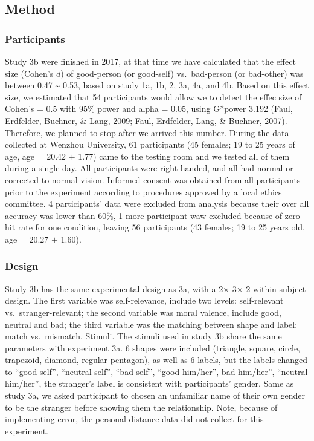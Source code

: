 \documentclass[
  english,
  man]{apa6}
\begin{document}
\hypertarget{method-4}{%
\subsection{Method}\label{method-4}}

\hypertarget{participants-5}{%
\subsubsection{Participants}\label{participants-5}}

Study 3b were finished in 2017, at that time we have calculated that the effect size (Cohen's \(d\)) of good-person (or good-self) vs.~bad-person (or bad-other) was between 0.47 \textasciitilde{} 0.53, based on study 1a, 1b, 2, 3a, 4a, and 4b. Based on this effect size, we estimated that 54 participants would allow we to detect the effec size of Cohen's = 0.5 with 95\% power and alpha = 0.05, using G*power 3.192 (Faul, Erdfelder, Buchner, \& Lang, 2009; Faul, Erdfelder, Lang, \& Buchner, 2007). Therefore, we planned to stop after we arrived this number. During the data collected at Wenzhou University, 61 participants (45 females; 19 to 25 years of age, age = 20.42 \(\pm\) 1.77) came to the testing room and we tested all of them during a single day. All participants were right-handed, and all had normal or corrected-to-normal vision. Informed consent was obtained from all participants prior to the experiment according to procedures approved by a local ethics committee. 4 participants' data were excluded from analysis because their over all accuracy was lower than 60\%, 1 more participant waw excluded because of zero hit rate for one condition, leaving 56 participants (43 females; 19 to 25 years old, age = 20.27 \(\pm\) 1.60).

\hypertarget{design-1}{%
\subsubsection{Design}\label{design-1}}

Study 3b has the same experimental design as 3a, with a 2× 3× 2 within-subject design. The first variable was self-relevance, include two levels: self-relevant vs.~stranger-relevant; the second variable was moral valence, include good, neutral and bad; the third variable was the matching between shape and label: match vs.~mismatch.
Stimuli. The stimuli used in study 3b share the same parameters with experiment 3a. 6 shapes were included (triangle, square, circle, trapezoid, diamond, regular pentagon), as well as 6 labels, but the labels changed to \enquote{good self}, \enquote{neutral self}, \enquote{bad self}, \enquote{good him/her}, bad him/her'', \enquote{neutral him/her}, the stranger's label is consistent with participants' gender. Same as study 3a, we asked participant to chosen an unfamiliar name of their own gender to be the stranger before showing them the relationship. Note, because of implementing error, the personal distance data did not collect for this experiment.
\end{document}
